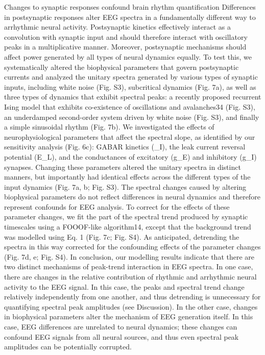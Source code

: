 Changes to synaptic responses confound brain rhythm quantification
Differences in postsynaptic responses alter EEG spectra in a fundamentally different way to arrhythmic neural activity. Postsynaptic kinetics effectively interact as a convolution with synaptic input and should therefore interact with oscillatory peaks in a multiplicative manner. Moreover, postsynaptic mechanisms should affect power generated by all types of neural dynamics equally. To test this, we systematically altered the biophysical parameters that govern postsynaptic currents and analyzed the unitary spectra generated by various types of synaptic inputs, including white noise (Fig. S3), subcritical dynamics (Fig. 7a), as well as three types of dynamics that exhibit spectral peaks: a recently proposed recurrent Ising model that exhibits co-existence of oscillations and avalanches34 (Fig. S3), an underdamped second-order system driven by white noise (Fig. S3), and finally a simple sinusoidal rhythm (Fig. 7b). We investigated the effects of neurophysiological parameters that affect the spectral slope, as identified by our sensitivity analysis (Fig. 6c): GABAR kinetics (\tau_I), the leak current reversal potential (E_L), and the conductances of excitatory (g_E) and inhibitory (g_I) synapses. Changing these parameters altered the unitary spectra in distinct manners, but importantly had identical effects across the different types of the input dynamics (Fig. 7a, b; Fig. S3). 
The spectral changes caused by altering biophysical parameters do not reflect differences in neural dynamics and therefore represent confounds for EEG analysis. To correct for the effects of these parameter changes, we fit the part of the spectral trend produced by synaptic timescales using a FOOOF-like algorithm14, except that the background trend was modelled using Eq. 1 (Fig. 7c; Fig. S4). As anticipated, detrending the spectra in this way corrected for the confounding effects of the parameter changes (Fig. 7d, e; Fig. S4).
	In conclusion, our modelling results indicate that there are two distinct mechanisms of peak-trend interaction in EEG spectra. In one case, there are changes in the relative contribution of rhythmic and arrhythmic neural activity to the EEG signal. In this case, the peaks and spectral trend change relatively independently from one another, and thus detrending is unnecessary for quantifying spectral peak amplitudes (see Discussion). In the other case, changes in biophysical parameters alter the mechanism of EEG generation itself. In this case, EEG differences are unrelated to neural dynamics; these changes can confound EEG signals from all neural sources, and thus even spectral peak amplitudes can be potentially corrupted.

